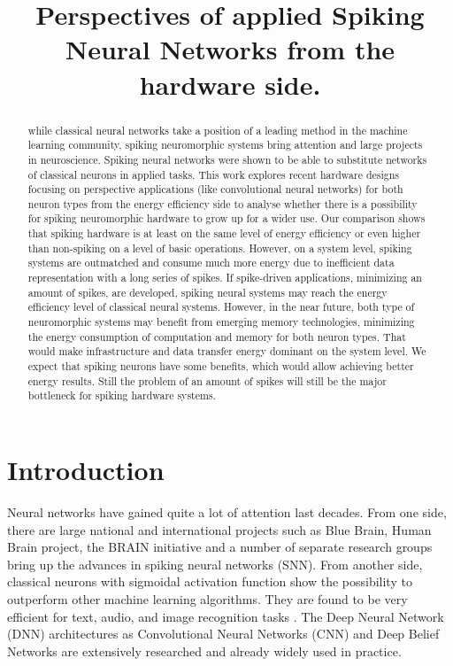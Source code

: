 \documentclass[conference, compsoc]{IEEEtran}
\begin{document}
\title{Perspectives of applied Spiking Neural Networks from the hardware side.}

\author{
\and
{}
}

\maketitle


\begin{abstract}
while classical neural networks take a position of a leading method in the machine learning community, spiking neuromorphic systems bring attention and large projects in neuroscience. Spiking neural networks were shown to be able to substitute networks of classical neurons in applied tasks. This work explores recent hardware designs focusing on perspective applications (like convolutional neural networks) for both neuron types from the energy efficiency side to analyse whether there is a possibility for spiking neuromorphic hardware to grow up for a wider use. Our comparison shows that spiking hardware is at least on the same level of energy efficiency or even higher than non-spiking on a level of basic operations. However, on a system level, spiking systems are outmatched and consume much more energy due to inefficient data representation with a long series of spikes. If spike-driven applications, minimizing an amount of spikes, are developed, spiking neural systems may reach the energy efficiency level of classical neural systems. However, in the near future, both type of neuromorphic systems may benefit from emerging memory technologies, minimizing the energy consumption of computation and memory for both neuron types. That would make infrastructure and data transfer energy dominant on the system level. We expect that spiking neurons have some benefits, which would allow achieving better energy results. Still the problem of an amount of spikes will still be the major bottleneck for spiking hardware systems.
\end{abstract}

\IEEEpeerreviewmaketitle



\section{Introduction}
Neural networks have gained quite a lot of attention last decades. From one side, there are large national and international projects such as Blue Brain, Human Brain project, the BRAIN initiative and a number of separate research groups bring up the advances in spiking neural networks (SNN). From another side, classical neurons with sigmoidal activation function show the possibility to outperform other machine learning algorithms. They are found to be very efficient for text, audio, and image recognition tasks \cite{Overview}. The Deep Neural Network (DNN) architectures as Convolutional Neural Networks (CNN) and Deep Belief Networks are extensively researched and already widely used in practice.
\end{document}
